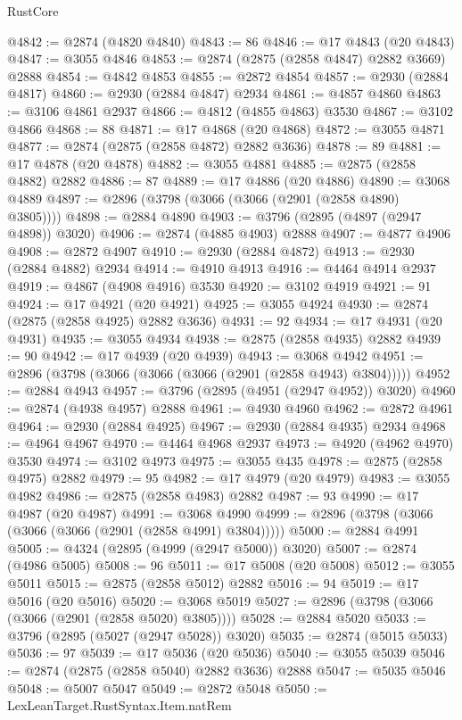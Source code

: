 \begin{lexlean}{RustCore}
\begin{coremodule}
@4842 := @2874 (@4820 @4840)
@4843 := 86
@4846 := @17 @4843 (@20 @4843)
@4847 := @3055 @4846
@4853 := @2874 (@2875 (@2858 @4847) @2882 @3669) @2888
@4854 := @4842 @4853
@4855 := @2872 @4854
@4857 := @2930 (@2884 @4817)
@4860 := @2930 (@2884 @4847) @2934
@4861 := @4857 @4860
@4863 := @3106 @4861 @2937
@4866 := @4812 (@4855 @4863) @3530
@4867 := @3102 @4866
@4868 := 88
@4871 := @17 @4868 (@20 @4868)
@4872 := @3055 @4871
@4877 := @2874 (@2875 (@2858 @4872) @2882 @3636)
@4878 := 89
@4881 := @17 @4878 (@20 @4878)
@4882 := @3055 @4881
@4885 := @2875 (@2858 @4882) @2882
@4886 := 87
@4889 := @17 @4886 (@20 @4886)
@4890 := @3068 @4889
@4897 := @2896 (@3798 (@3066 (@3066 (@2901 (@2858 @4890) @3805))))
@4898 := @2884 @4890
@4903 := @3796 (@2895 (@4897 (@2947 @4898)) @3020)
@4906 := @2874 (@4885 @4903) @2888
@4907 := @4877 @4906
@4908 := @2872 @4907
@4910 := @2930 (@2884 @4872)
@4913 := @2930 (@2884 @4882) @2934
@4914 := @4910 @4913
@4916 := @4464 @4914 @2937
@4919 := @4867 (@4908 @4916) @3530
@4920 := @3102 @4919
@4921 := 91
@4924 := @17 @4921 (@20 @4921)
@4925 := @3055 @4924
@4930 := @2874 (@2875 (@2858 @4925) @2882 @3636)
@4931 := 92
@4934 := @17 @4931 (@20 @4931)
@4935 := @3055 @4934
@4938 := @2875 (@2858 @4935) @2882
@4939 := 90
@4942 := @17 @4939 (@20 @4939)
@4943 := @3068 @4942
@4951 := @2896 (@3798 (@3066 (@3066 (@3066 (@2901 (@2858 @4943) @3804)))))
@4952 := @2884 @4943
@4957 := @3796 (@2895 (@4951 (@2947 @4952)) @3020)
@4960 := @2874 (@4938 @4957) @2888
@4961 := @4930 @4960
@4962 := @2872 @4961
@4964 := @2930 (@2884 @4925)
@4967 := @2930 (@2884 @4935) @2934
@4968 := @4964 @4967
@4970 := @4464 @4968 @2937
@4973 := @4920 (@4962 @4970) @3530
@4974 := @3102 @4973
@4975 := @3055 @435
@4978 := @2875 (@2858 @4975) @2882
@4979 := 95
@4982 := @17 @4979 (@20 @4979)
@4983 := @3055 @4982
@4986 := @2875 (@2858 @4983) @2882
@4987 := 93
@4990 := @17 @4987 (@20 @4987)
@4991 := @3068 @4990
@4999 := @2896 (@3798 (@3066 (@3066 (@3066 (@2901 (@2858 @4991) @3804)))))
@5000 := @2884 @4991
@5005 := @4324 (@2895 (@4999 (@2947 @5000)) @3020)
@5007 := @2874 (@4986 @5005)
@5008 := 96
@5011 := @17 @5008 (@20 @5008)
@5012 := @3055 @5011
@5015 := @2875 (@2858 @5012) @2882
@5016 := 94
@5019 := @17 @5016 (@20 @5016)
@5020 := @3068 @5019
@5027 := @2896 (@3798 (@3066 (@3066 (@2901 (@2858 @5020) @3805))))
@5028 := @2884 @5020
@5033 := @3796 (@2895 (@5027 (@2947 @5028)) @3020)
@5035 := @2874 (@5015 @5033)
@5036 := 97
@5039 := @17 @5036 (@20 @5036)
@5040 := @3055 @5039
@5046 := @2874 (@2875 (@2858 @5040) @2882 @3636) @2888
@5047 := @5035 @5046
@5048 := @5007 @5047
@5049 := @2872 @5048
@5050 := LexLeanTarget.RustSyntax.Item.natRem

\end{coremodule}
\end{lexlean}
